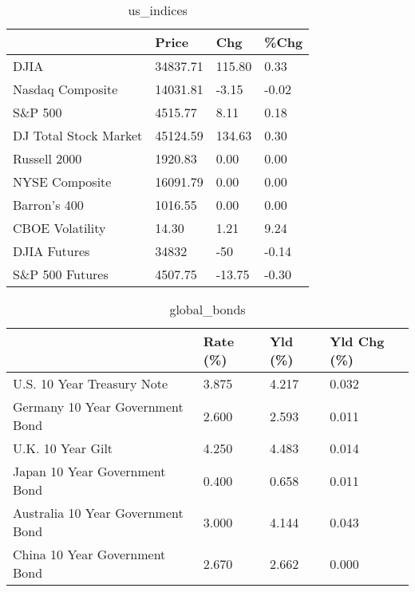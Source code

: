 \documentclass{article}%
\begin{document}
%


\begin{table}[htbp]%
\caption{us\_indices}%
\centering%
\begin{adjustbox}{width=1\textwidth}%
\begin{tabular}{llll}
\toprule
                      &    Price &    Chg &  \%Chg \\
\midrule
                 DJIA & 34837.71 & 115.80 &  0.33 \\
     Nasdaq Composite & 14031.81 &  -3.15 & -0.02 \\
              S\&P 500 &  4515.77 &   8.11 &  0.18 \\
DJ Total Stock Market & 45124.59 & 134.63 &  0.30 \\
         Russell 2000 &  1920.83 &   0.00 &  0.00 \\
       NYSE Composite & 16091.79 &   0.00 &  0.00 \\
         Barron's 400 &  1016.55 &   0.00 &  0.00 \\
      CBOE Volatility &    14.30 &   1.21 &  9.24 \\
         DJIA Futures &    34832 &    -50 & -0.14 \\
      S\&P 500 Futures &  4507.75 & -13.75 & -0.30 \\
\bottomrule
\end{tabular}
%
\end{adjustbox}%
\end{table}

%


\begin{table}[htbp]%
\caption{global\_bonds}%
\centering%
\begin{adjustbox}{width=1\textwidth}%
\begin{tabular}{llll}
\toprule
                                  & Rate (\%) & Yld (\%) & Yld Chg (\%) \\
\midrule
       U.S. 10 Year Treasury Note &    3.875 &   4.217 &       0.032 \\
  Germany 10 Year Government Bond &    2.600 &   2.593 &       0.011 \\
                U.K. 10 Year Gilt &    4.250 &   4.483 &       0.014 \\
    Japan 10 Year Government Bond &    0.400 &   0.658 &       0.011 \\
Australia 10 Year Government Bond &    3.000 &   4.144 &       0.043 \\
    China 10 Year Government Bond &    2.670 &   2.662 &       0.000 \\
\bottomrule
\end{tabular}
%
\end{adjustbox}%
\end{table}
\end{document}
